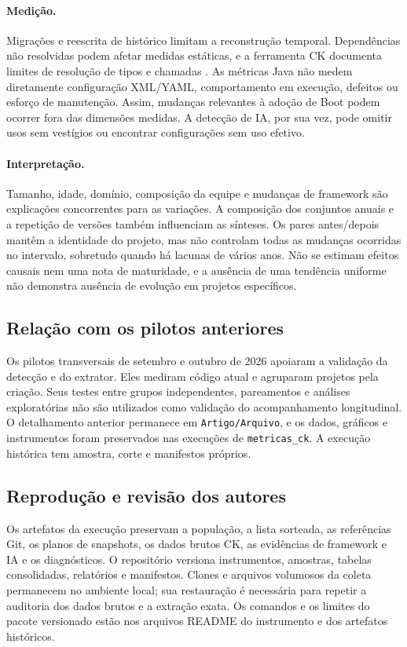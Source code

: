 \paragraph{Medição.}
Migrações e reescrita de histórico limitam a reconstrução temporal. Dependências não resolvidas podem afetar medidas estáticas, e a ferramenta CK documenta limites de resolução de tipos e chamadas \cite{aniche:ck}. As métricas Java não medem diretamente configuração XML/YAML, comportamento em execução, defeitos ou esforço de manutenção. Assim, mudanças relevantes à adoção de Boot podem ocorrer fora das dimensões medidas. A detecção de IA, por sua vez, pode omitir usos sem vestígios ou encontrar configurações sem uso efetivo.

\paragraph{Interpretação.}
Tamanho, idade, domínio, composição da equipe e mudanças de framework são explicações concorrentes para as variações. A composição dos conjuntos anuais e a repetição de versões também influenciam as sínteses. Os pares antes/depois mantêm a identidade do projeto, mas não controlam todas as mudanças ocorridas no intervalo, sobretudo quando há lacunas de vários anos. Não se estimam efeitos causais nem uma nota de maturidade, e a ausência de uma tendência uniforme não demonstra ausência de evolução em projetos específicos.

\subsection{Relação com os pilotos anteriores}

Os pilotos transversais de setembro e outubro de 2026 apoiaram a validação da detecção e do extrator. Eles mediram código atual e agruparam projetos pela criação. Seus testes entre grupos independentes, pareamentos e análises exploratórias não são utilizados como validação do acompanhamento longitudinal. O detalhamento anterior permanece em \texttt{Artigo/Arquivo}, e os dados, gráficos e instrumentos foram preservados nas execuções de \texttt{metricas\_ck}. A execução histórica tem amostra, corte e manifestos próprios.

\subsection{Reprodução e revisão dos autores}

Os artefatos da execução preservam a população, a lista sorteada, as referências Git, os planos de snapshots, os dados brutos CK, as evidências de framework e IA e os diagnósticos. O repositório versiona instrumentos, amostras, tabelas consolidadas, relatórios e manifestos. Clones e arquivos volumosos da coleta permanecem no ambiente local; sua restauração é necessária para repetir a auditoria dos dados brutos e a extração exata. Os comandos e os limites do pacote versionado estão nos arquivos README do instrumento e dos artefatos históricos.

